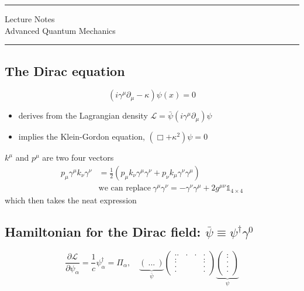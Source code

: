\documentclass[11pt]{article}
\author{Aayush Arya}
\title{}
\date{January 26, 2023}
\newcommand{\lag}{\mathcal{L}}
\begin{document}
	\maketitle
	
	\hrule
	\begin{center}
		Lecture Notes\\
		Advanced Quantum Mechanics
	\end{center}
	\hrule 
	
	\vspace{11pt}
	
	\subsection*{The Dirac equation}
	\[ (i\gamma^\mu \partial_\mu - \kappa)\psi(x) = 0\]
		
		\begin{itemize}
			\item derives from the Lagrangian density $\lag = \bar{\psi} (i\gamma^\mu \partial_\mu)\psi$
			\item implies the Klein-Gordon equation, $(\Box + \kappa^2) \psi = 0$
		\end{itemize}
		
		$k^\mu$ and $p^\mu$ are two four vectors
			\begin{align*}
				p_\mu \gamma^\mu k_\nu \gamma^\nu &= \frac{1}{2}(p_\mu k_\nu \gamma^\mu \gamma^\nu + p_\nu k_\mu \gamma^\nu \gamma^\mu)\\
				    & \text{we can replace}\ \gamma^\mu \gamma^\nu = -\gamma^\nu \gamma^\mu + 2g^{\mu\nu} \mathbb{1}_{4\times 4}
			\end{align*}
		which then takes the neat expression
		\begin{center}
		\end{center}
	\subsection*{Hamiltonian for the Dirac field: $\bar{\psi}\equiv \psi^\dagger\gamma^0$}
	
	\[ \frac{\partial \lag}{\partial \psi_\alpha} = \frac{1}{c} \psi^\dagger_\alpha = \Pi_\alpha, \quad \underbrace{(\ ... \ )}_{\bar{\psi}} \begin{pmatrix} .. & . & . & . \\ : &  & & : \\
			. &  & & .\\ 
			. & & & .\end{pmatrix}
		\underbrace{\begin{pmatrix}
				: \\ .\\. \\.
		\end{pmatrix}}_{\psi} \]
	
\end{document}
